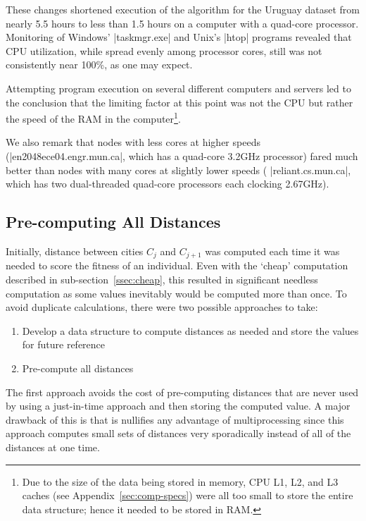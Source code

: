 These changes shortened execution of the algorithm for the Uruguay dataset
from nearly 5.5 hours to less than 1.5 hours on a computer with a quad-core
processor. Monitoring of Windows' |taskmgr.exe| and Unix's |htop| programs
revealed that CPU utilization, while spread evenly among processor cores,
still was not consistently near 100\%, as one may expect. 

Attempting program execution on several different computers and servers 
led to the conclusion that the limiting factor at this point was not the CPU 
but rather the speed of the RAM in the computer\footnote{Due to the size of
the data being stored in memory, CPU L1, L2, and L3 caches (see
Appendix~\ref{sec:comp-specs}) were all too small to store the entire 
data structure; hence it needed to be stored in RAM.}. 

We also remark that nodes with less cores at higher speeds
(\ie |en2048ece04.engr.mun.ca|, which has a quad-core 3.2GHz processor) 
fared much better than nodes with many cores at slightly lower speeds (\ie 
|reliant.cs.mun.ca|, which has two dual-threaded quad-core processors 
each clocking 2.67GHz).

\subsection{Pre-computing All Distances}\label{ssec:precomputing}
Initially, distance between cities $C_j$ and $C_{j+1}$ was computed each time 
it was needed to score the fitness of an individual. Even with the `cheap' 
computation described in sub-section~\ref{ssec:cheap}, this resulted in
significant needless computation as some values inevitably would be 
computed more than once. To avoid duplicate calculations, there were two
possible approaches to take:
\begin{enumerate}[label={(\roman*)}]
	\item Develop a data structure to compute distances as needed and 
	store the values for future reference
	\item Pre-compute all distances
\end{enumerate}
The first approach avoids the cost of pre-computing distances that are 
never used by using a just-in-time approach and then storing the computed
value. A major drawback of this is that is nullifies any advantage of 
multiprocessing since this approach computes small sets of distances 
very sporadically instead of all of the distances at one time.



